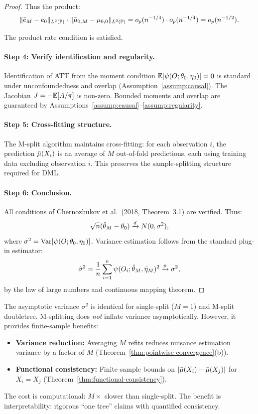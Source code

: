 \documentclass[12pt]{article}
\newcommand{\convd}{\xrightarrow{d}}
\newcommand{\convp}{\xrightarrow{p}}
\begin{document}
\begin{proof}
Thus the product:
\[
\|\bar{e}_M - e_0\|_{L^2(\mathbb{P})} \cdot \|\bar{\mu}_{0,M} - \mu_{0,0}\|_{L^2(\mathbb{P})} = o_p(n^{-1/4}) \cdot o_p(n^{-1/4}) = o_p(n^{-1/2}).
\]

The product rate condition is satisfied. \checkmark

\paragraph{Step 4: Verify identification and regularity.}
Identification of ATT from the moment condition $\mathbb{E}[\psi(O; \theta_0, \eta_0)] = 0$ is standard under unconfoundedness and overlap (Assumption~\ref{assump:causal}). The Jacobian $J = -\mathbb{E}[A/\pi]$ is non-zero. Bounded moments and overlap are guaranteed by Assumptions~\ref{assump:causal}--\ref{assump:regularity}. \checkmark

\paragraph{Step 5: Cross-fitting structure.}
The M-split algorithm maintains cross-fitting: for each observation $i$, the prediction $\bar{\mu}(X_i)$ is an average of $M$ out-of-fold predictions, each using training data excluding observation $i$. This preserves the sample-splitting structure required for DML. \checkmark

\paragraph{Step 6: Conclusion.}
All conditions of Chernozhukov et al.\ (2018, Theorem~3.1) are verified. Thus:
\[
\sqrt{n}(\thetahat_M - \theta_0) \convd N(0, \sigma^2),
\]
where $\sigma^2 = \operatorname{Var}[\psi(O; \theta_0, \eta_0)]$. Variance estimation follows from the standard plug-in estimator:
\[
\hat\sigma^2 = \frac{1}{n} \sum_{i=1}^n \psi(O_i; \thetahat_M, \etabar_M)^2 \convp \sigma^2,
\]
by the law of large numbers and continuous mapping theorem.
\end{proof}

\begin{remark}
The asymptotic variance $\sigma^2$ is identical for single-split ($M=1$) and M-split doubletree. M-splitting does \emph{not} inflate variance asymptotically. However, it provides finite-sample benefits:
\begin{itemize}
\item \textbf{Variance reduction:} Averaging $M$ refits reduces nuisance estimation variance by a factor of $M$ (Theorem~\ref{thm:pointwise-convergence}(b)).
\item \textbf{Functional consistency:} Finite-sample bounds on $|\bar{\mu}(X_i) - \bar{\mu}(X_j)|$ for $X_i = X_j$ (Theorem~\ref{thm:functional-consistency}).
\end{itemize}

The cost is computational: $M\times$ slower than single-split. The benefit is interpretability: rigorous ``one tree'' claims with quantified consistency.
\end{remark}
\end{document}
